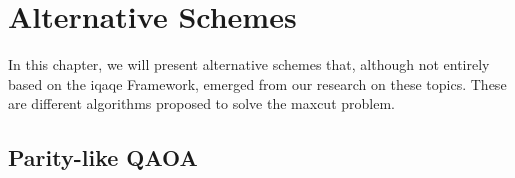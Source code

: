 
\chapter{Alternative Schemes}
\label{chapter:Exploratory_Ideas}

In this chapter, we will present alternative schemes that, although not entirely based on the \acrshort{iqaqe} Framework, emerged from our research on these topics. These are different algorithms proposed to solve the \acrshort{maxcut} problem.

\section{Parity-like QAOA}
\label{section:Parity_QAOA}

